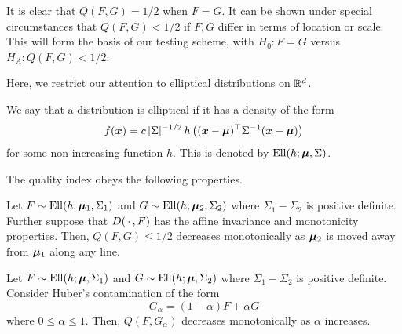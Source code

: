 It is clear that $Q(F, G) = 1/2$ when $F = G$.
It can be shown under special circumstances that $Q(F, G) < 1/2$ if $F, G$
differ in terms of location or scale.
This will form the basis of our testing scheme, with $H_0: F = G$ versus $H_A:
Q(F, G) < 1/2$.

Here, we restrict our attention to elliptical distributions on $\mathbb{R}^d$.

\begin{definition}
    We say that a distribution is elliptical if it has a density of the form
    \begin{equation}
        f(\bm{x}) = c\, |\Sigma|^{-1/2}\, h\left((\bm{x} - \bm{\mu})^\top \Sigma^{-1} (\bm{x} - \bm{\mu})\right)
    \end{equation}
    for some non-increasing function $h$.
    This is denoted by $\operatorname{Ell}(h; \bm{\mu}, \Sigma)$.
\end{definition}



The quality index obeys the following properties.

\begin{proposition}
    Let $F \sim \operatorname{Ell}(h; \bm{\mu}_1, \Sigma_1)$ and $G \sim \operatorname{Ell}(h; \bm{\mu}_2,
    \Sigma_2)$ where $\Sigma_1 - \Sigma_2$ is positive definite.
    Further suppose that $D(\,\cdot\,, F)$ has the affine invariance and
    monotonicity properties.
    Then, $Q(F, G) \leq 1/2$ decreases monotonically as $\bm{\mu}_2$ is moved away
    from $\bm{\mu}_1$ along any line.
\end{proposition}

\begin{proposition}
    Let $F \sim \operatorname{Ell}(h; \bm{\mu}, \Sigma_1)$ and $G \sim \operatorname{Ell}(h; \bm{\mu},
    \Sigma_2)$ where $\Sigma_1 - \Sigma_2$ is positive definite.
    Consider Huber's contamination of the form
    \begin{equation}
        G_\alpha = (1 - \alpha)F + \alpha G
    \end{equation}
    where $0 \leq \alpha \leq 1$.
    Then, $Q(F, G_\alpha)$ decreases monotonically as $\alpha$ increases.
\end{proposition}

